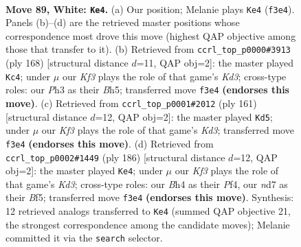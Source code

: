 \documentclass[11pt]{article}
\begin{document}
\clearpage

\begin{figure}[p]\centering
\begin{subfigure}{0.46\textwidth}\centering
\resizebox{\linewidth}{!}{%
\newchessgame
\chessboard[
  setfen={7k/3n4/8/8/p4P1B/P4K1P/8/8 w - - 4 89},
  showmover=false,
  pgfstyle=straightmove, color=movearrow, markmove={f3-e4}
]}
\caption{}
\end{subfigure}\hfill
\begin{subfigure}{0.46\textwidth}\centering
\resizebox{\linewidth}{!}{%
\newchessgame
\chessboard[
  setfen={5k2/2p5/8/3nP2B/3P4/3K4/8/8 w - - 29 85},
  showmover=false,
  pgfstyle=straightmove, color=movearrow, markmove={d3-c4}
]}
\caption{}
\end{subfigure}
\\[4pt]
\begin{subfigure}{0.46\textwidth}\centering
\resizebox{\linewidth}{!}{%
\newchessgame
\chessboard[
  setfen={8/8/2pk4/p7/P4P2/3K4/8/8 b - - 0 81},
  showmover=false,
  pgfstyle=straightmove, color=movearrow, markmove={d6-d5}
]}
\caption{}
\end{subfigure}\hfill
\begin{subfigure}{0.46\textwidth}\centering
\resizebox{\linewidth}{!}{%
\newchessgame
\chessboard[
  setfen={8/8/1n1k4/5B1p/5P1P/3K4/8/8 w - - 5 94},
  showmover=false,
  pgfstyle=straightmove, color=movearrow, markmove={d3-e4}
]}
\caption{}
\end{subfigure}
\caption{\textbf{Move 89, White: \texttt{Ke4}.} (a) Our position; Melanie plays \texttt{Ke4} (\texttt{f3e4}). Panels (b)--(d) are the retrieved master positions whose correspondence most drove this move (highest QAP objective among those that transfer to it). (b) Retrieved from \texttt{ccrl\_top\_p0000\#3913} (ply 168) [structural distance $d$=11, QAP obj=2]: the master played \texttt{Kc4}; under $\mu$ our \emph{Kf3} plays the role of that game's \emph{Kd3}; cross-type roles: our \emph{P}h3 as their \emph{B}h5; transferred move \texttt{f3e4} \textbf{(endorses this move)}. (c) Retrieved from \texttt{ccrl\_top\_p0001\#2012} (ply 161) [structural distance $d$=12, QAP obj=2]: the master played \texttt{Kd5}; under $\mu$ our \emph{Kf3} plays the role of that game's \emph{Kd3}; transferred move \texttt{f3e4} \textbf{(endorses this move)}. (d) Retrieved from \texttt{ccrl\_top\_p0002\#1449} (ply 186) [structural distance $d$=12, QAP obj=2]: the master played \texttt{Ke4}; under $\mu$ our \emph{Kf3} plays the role of that game's \emph{Kd3}; cross-type roles: our \emph{B}h4 as their \emph{P}f4, our \emph{n}d7 as their \emph{B}f5; transferred move \texttt{f3e4} \textbf{(endorses this move)}. Synthesis: 12 retrieved analogs transferred to \texttt{Ke4} (summed QAP objective 21, the strongest correspondence among the candidate moves); Melanie committed it via the \texttt{search} selector.}
\label{fig:thought-m176}
\end{figure}
\end{document}
